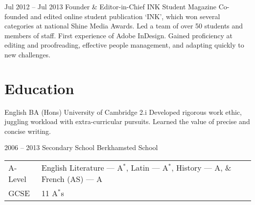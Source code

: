 \documentclass[DIV=15,color=blue!60!green!90]{komacv}
\begin{document}
  \cventry
  {Jul 2012 -- Jul 2013}
  {Founder \& Editor-in-Chief}
  {INK Student Magazine}
  {}
  {}
  {Co-founded and edited online student publication `INK', which won several
  categories at national Shine Media Awards. Led a team of over 50 students and
  members of staff. First experience of Adobe InDesign. Gained proficiency at
  editing and proofreading, effective people management, and adapting quickly to
  new challenges.}


  \section{Education}

  {English BA (Hons)}
  {University of Cambridge}
  {}
  {2.i}
  {Developed rigorous work ethic, juggling workload with extra-curricular
  pursuits. Learned the value of precise and concise writing.}

  \cventry
  {2006 -- 2013}
  {Secondary School}
  {Berkhamsted School}
  {}
  {}
  {
    \begin{tabular}{@{}ll}
      A-Level & English Literature --- A$^*$, Latin --- A$^*$, History --- A, \& French (AS) --- A\\
      GCSE & 11 A$^*$s
    \end{tabular}
  }
\end{document}
